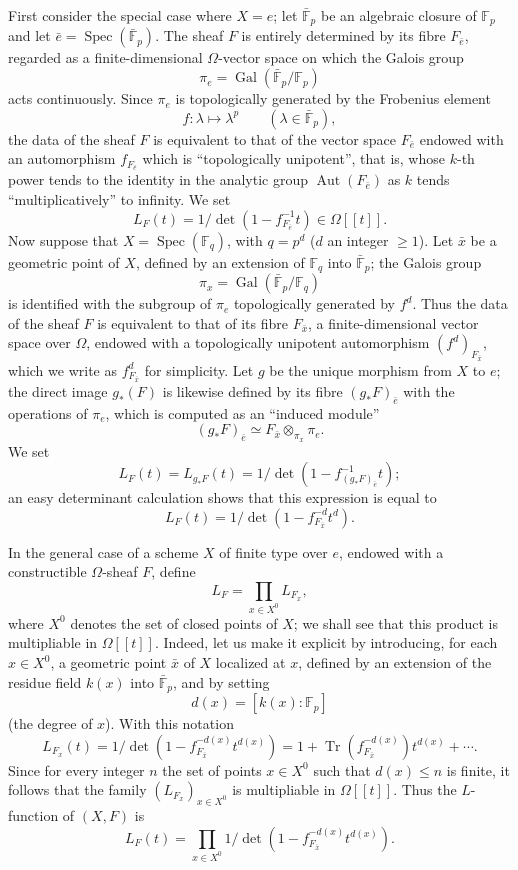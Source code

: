 \documentclass[11pt]{article}
\DeclareMathOperator{\Spec}{Spec}
\providecommand{\Gal}{\operatorname{Gal}}
\providecommand{\Tr}{\operatorname{Tr}}
\providecommand{\Tr}{\operatorname{Tr}}
\providecommand{\Tr}{\operatorname{Tr}}
\providecommand{\Aut}{\operatorname{Aut}}
\providecommand{\Tr}{\operatorname{Tr}}
\providecommand{\Spec}{\operatorname{Spec}}
\providecommand{\Spec}{\operatorname{Spec}}
\providecommand{\Aut}{\operatorname{Aut}}
\providecommand{\Spec}{\operatorname{Spec}}
\providecommand{\Tr}{\operatorname{Tr}}
\providecommand{\Spec}{\operatorname{Spec}}
\providecommand{\Gal}{\operatorname{Gal}}
\begin{document}
First consider the special case where $X=e$; let $\bar{\mathbb F}_p$ be an algebraic closure of $\mathbb F_p$ and let $\bar e=\Spec(\bar{\mathbb F}_p)$. The sheaf $F$ is entirely determined by its fibre $F_{\bar e}$, regarded as a finite-dimensional $\Omega$-vector space on which the Galois group
\[
\pi_e=\Gal(\bar{\mathbb F}_p/\mathbb F_p)
\]
acts continuously. Since $\pi_e$ is topologically generated by the Frobenius element
\[
f:\lambda\longmapsto\lambda^p\qquad(\lambda\in\bar{\mathbb F}_p),
\]
the data of the sheaf $F$ is equivalent to that of the vector space $F_{\bar e}$ endowed with an automorphism $f_{F_{\bar e}}$ which is ``topologically unipotent'', that is, whose $k$-th power tends to the identity in the analytic group $\Aut(F_{\bar e})$ as $k$ tends ``multiplicatively'' to infinity. We set
\[
L_F(t)=1/\det(1-f_{F_{\bar e}}^{-1}t)\in\Omega[[t]].
\]
Now suppose that $X=\Spec(\mathbb F_q)$, with $q=p^d$ ($d$ an integer $\ge1$). Let $\bar x$ be a geometric point of $X$, defined by an extension of $\mathbb F_q$ into $\bar{\mathbb F}_p$; the Galois group
\[
\pi_x=\Gal(\bar{\mathbb F}_p/\mathbb F_q)
\]
is identified with the subgroup of $\pi_e$ topologically generated by $f^d$. Thus the data of the sheaf $F$ is equivalent to that of its fibre $F_{\bar x}$, a finite-dimensional vector space over $\Omega$, endowed with a topologically unipotent automorphism $(f^d)_{F_{\bar x}}$, which we write as $f^d_{F_{\bar x}}$ for simplicity. Let $g$ be the unique morphism from $X$ to $e$; the direct image $g_*(F)$ is likewise defined by its fibre $(g_*F)_{\bar e}$ with the operations of $\pi_e$, which is computed as an ``induced module''
\[
(g_*F)_{\bar e}\simeq F_{\bar x}\otimes_{\pi_x}\pi_e.
\]
We set
\[
L_F(t)=L_{g_*F}(t)=1/\det(1-f^{-1}_{(g_*F)_{\bar e}}t);
\]
an easy determinant calculation shows that this expression is equal to
\[
L_F(t)=1/\det(1-f^{-d}_{F_{\bar x}}t^d).
\]

In the general case of a scheme $X$ of finite type over $e$, endowed with a constructible $\Omega$-sheaf $F$, define
\[
L_F=\prod_{x\in X^0}L_{F_x},
\]
where $X^0$ denotes the set of closed points of $X$; we shall see that this product is multipliable in $\Omega[[t]]$. Indeed, let us make it explicit by introducing, for each $x\in X^0$, a geometric point $\bar x$ of $X$ localized at $x$, defined by an extension of the residue field $k(x)$ into $\bar{\mathbb F}_p$, and by setting
\[
d(x)=[k(x):\mathbb F_p]
\]
(the degree of $x$). With this notation
\[
L_{F_x}(t)=1/\det(1-f_{F_{\bar x}}^{-d(x)}t^{d(x)})
 =1+\Tr(f_{F_{\bar x}}^{-d(x)})t^{d(x)}+\cdots .
\]
Since for every integer $n$ the set of points $x\in X^0$ such that $d(x)\le n$ is finite, it follows that the family $(L_{F_x})_{x\in X^0}$ is multipliable in $\Omega[[t]]$. Thus the $L$-function of $(X,F)$ is
\[
L_F(t)=\prod_{x\in X^0}1/\det(1-f_{F_{\bar x}}^{-d(x)}t^{d(x)}).
\]
\end{document}
